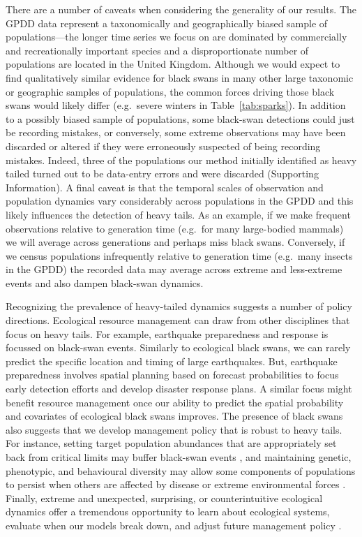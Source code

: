 There are a number of caveats when considering the generality of our results.
The GPDD data represent a taxonomically and geographically biased sample of
populations---the longer time series we focus on are dominated by commercially
and recreationally important species and a disproportionate number of
populations are located in the United Kingdom. Although we would expect to find
qualitatively similar evidence for black swans in many other large taxonomic or
geographic samples of populations, the common forces driving those black swans
would likely differ (e.g.~severe winters in Table~\ref{tab:sparks}). In
addition to a possibly biased sample of populations, some black-swan detections
could just be recording mistakes, or conversely, some extreme observations may
have been discarded or altered if they were erroneously suspected of being
recording mistakes. Indeed, three of the populations our method initially
identified as heavy tailed turned out to be data-entry errors and were
discarded (Supporting Information). A final caveat is that the temporal scales
of observation and population dynamics vary considerably across populations in
the GPDD and this likely influences the detection of heavy tails. As an
example, if we make frequent observations relative to generation time (e.g.~for
many large-bodied mammals) we will average across generations and perhaps miss
black swans. Conversely, if we census populations infrequently relative to
generation time (e.g.~many insects in the GPDD) the recorded data may average
across extreme and less-extreme events and also dampen black-swan dynamics.

Recognizing the prevalence of heavy-tailed dynamics suggests a number of
policy directions. Ecological resource management can draw from other
disciplines that focus on heavy tails. For example, earthquake preparedness
and response is focussed on black-swan events. Similarly to ecological black
swans, we can rarely predict the specific location and timing of large
earthquakes. But, earthquake preparedness involves spatial planning based on
forecast probabilities to focus early detection efforts and develop disaster
response plans. A similar focus might benefit resource management once our
ability to predict the spatial probability and covariates of ecological black
swans improves. The presence of black swans also suggests that we develop
management policy that is robust to heavy tails. For instance, setting target
population abundances that are appropriately set back from critical limits may
buffer black-swan events \citep[e.g.][]{caddy1996}, and maintaining genetic,
phenotypic, and behavioural diversity may allow some components of populations
to persist when others are affected by disease or extreme environmental forces
\citep[e.g.][]{hilborn2003, schindler2010, anderson2014}. Finally, extreme and
unexpected, surprising, or counterintuitive ecological dynamics offer a
tremendous opportunity to learn about ecological systems, evaluate when our
models break down, and adjust future management policy \citep{doak2008,
  pine-iii2009, lindenmayer2010}.

